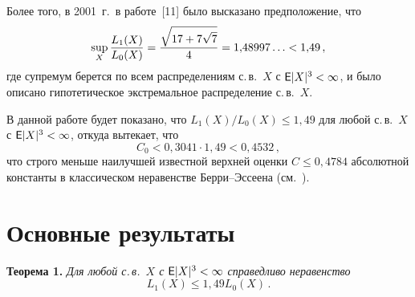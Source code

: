 \begin{multicols}{2}
Более того, в 2001~г.\ в работе~[11] было высказано
предположение, что
\begin{equation*}
\sup_X \displaystyle\frac{\displaystyle L_1(X)\mathstrut}{\displaystyle L_0(X)\mathstrut}=
\displaystyle\frac{\displaystyle \sqrt{17+7\sqrt{7}}\mathstrut}{\displaystyle 4\mathstrut}={1{,}48997\ldots} <1{,}49\,,
\end{equation*}
где супремум берется по всем распределениям с.\,в.~$X$ с
${{\sf E}|X|^3<\infty}$, и было описано гипотетическое экстремальное
распределение с.\,в.~$X$.

В данной работе будет показано, что $L_1(X)/L_0(X)\leqslant 1{,}49$ для любой
с.\,в.~$X$ с ${\sf E}|X|^3<\infty$, откуда вытекает, что
\begin{equation*}
C_0<0{,}3041\cdot1{,}49<0{,}4532\,,
\end{equation*}
что строго меньше наилучшей известной верхней оценки $C\leqslant0{,}4784$
абсолютной константы в классическом неравенстве Берри--Эссеена
(см.~\cite{KorolevShevtsova2010OPPM, KorolevShevtsova2010SAJ}).

\section{Основные результаты}

\noindent
\textbf{Теорема 1.}
\textit{Для любой с.\,в.~$X$ с ${\sf E}|X|^3<\infty$ справедливо неравенство}
\begin{equation*}
L_1(X)\leqslant 1{,}49 L_0(X)\,.
\end{equation*}

\smallskip


\end{multicols}

